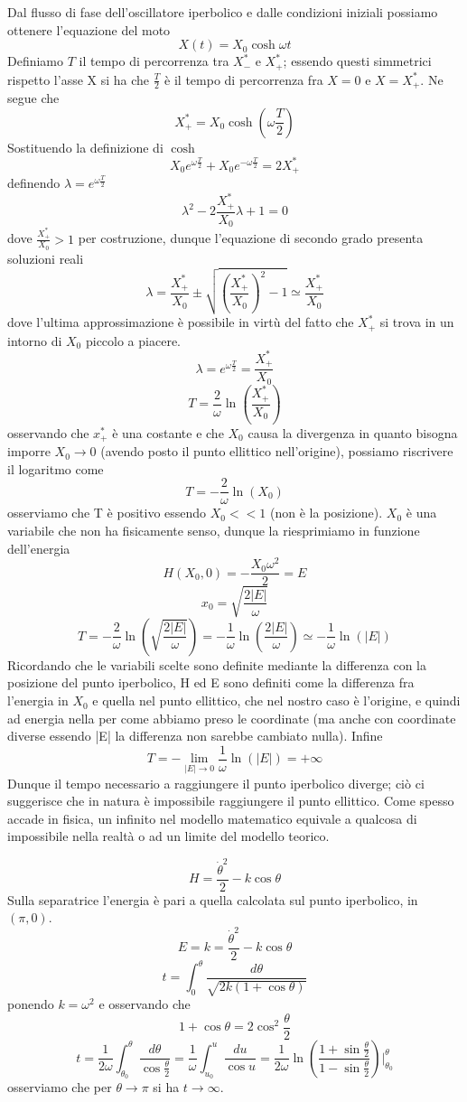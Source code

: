 \documentclass[
10pt, %
a4paper, %
oneside, %
headinclude,footinclude, %
BCOR5mm, %
]{scrartcl}
\begin{document}
\FloatBarrier
Dal flusso di fase dell'oscillatore iperbolico e dalle condizioni iniziali possiamo ottenere l'equazione del moto 
\[X(t) = X_0 \cosh\omega t\]
Definiamo \(T\) il tempo di percorrenza tra \(X^*_-\) e \(X^*_+\); essendo questi simmetrici rispetto l'asse X si ha che \(\frac{T}{2}\) è il tempo di percorrenza fra \(X=0\) e \(X= X^*_+\). Ne segue che 
\[X^*_+ = X_0\cosh(\omega \frac{T}{2})\]
Sostituendo la definizione di $\cosh$
\[X_0e^{\omega \frac{T}{2}}+X_0 e^{-\omega \frac{T}{2}} = 2X^*_+\]
definendo \(\lambda = e^{\omega \frac{T}{2}}\)
\[\lambda^2 -2\frac{X^*_+}{X_0}\lambda +1 = 0\]
dove \(\frac{X^*_+}{X_0}>1\) per costruzione, dunque l'equazione di secondo grado presenta soluzioni reali
\[\lambda = \frac{X^*_+}{X_0}\pm\sqrt{\left(\frac{X^*_+}{X_0}\right)^2-1}\simeq \frac{X^*_+}{X_0}\]
dove l'ultima approssimazione è possibile in virtù del fatto che \(X^*_+\) si trova in un intorno di \(X_0\) piccolo a piacere.
\[\lambda = e^{\omega \frac{T}{2}} = \frac{X^*_+}{X_0}\]
\[T = \frac{2}{\omega}\ln\left( \frac{X^*_+}{X_0}\right)\]
osservando che \(x^*_+\) è una costante e che \(X_0\) causa la divergenza in quanto bisogna imporre \(X_0 \to 0\) (avendo posto il punto ellittico nell'origine), possiamo riscrivere il logaritmo come
\[T = -\frac{2}{\omega}\ln( X_0)\]
osserviamo che T è positivo essendo \(X_0 << 1\) (non è la posizione). \(X_0\) è una variabile che non ha fisicamente senso, dunque la riesprimiamo in funzione dell'energia
\[H(X_0, 0) = -\frac{X_0\omega^2}{2} = E\]
\[x_0 = \sqrt{\frac{2|E|}{\omega}}\]
\[T  = -\frac{2}{\omega}\ln\left(\sqrt{\frac{2|E|}{\omega}}\right) = -\frac{1}{\omega}\ln\left(\frac{2|E|}{\omega}\right)\simeq -\frac{1}{\omega}\ln(|E|)\]
Ricordando che le variabili scelte sono definite mediante la differenza con la posizione del punto iperbolico, H ed E sono definiti come la differenza fra l'energia in \(X_0\) e quella nel punto ellittico, che nel nostro caso è l'origine, e quindi ad energia nella per come abbiamo preso le coordinate (ma anche con coordinate diverse essendo |E| la differenza non sarebbe cambiato nulla). Infine
\[T=-\lim_{|E|\to 0}\frac{1}{\omega}\ln(|E|) = +\infty\]
Dunque il tempo necessario a raggiungere il punto iperbolico diverge; ciò ci suggerisce che in natura è impossibile raggiungere il punto ellittico. Come spesso accade in fisica, un infinito nel modello matematico equivale a qualcosa di impossibile nella realtà o ad un limite del modello teorico.
\begin{esempio}[Il pendolo]
	\[H = \frac{\dot{\theta}^2}{2}-k\cos\theta\]
	Sulla separatrice l'energia è pari a quella calcolata sul punto iperbolico, in \((\pi, 0)\). 
	\[E = k = \frac{\dot{\theta}^2}{2}-k\cos\theta\]
	\[t = \int_0^{\theta}\frac{d\theta}{\sqrt{2k(1+\cos\theta)}} \]
	ponendo \(k = \omega^2\) e osservando che
	\[1+\cos\theta = 2\cos^2\frac{\theta}{2}\]
	\[t = \frac{1}{2\omega}\int_{\theta_0}^\theta \frac{d\theta}{\cos\frac{\theta}{2}}=\frac{1}{\omega}\int^u_{u_0}\frac{du}{\cos u} = \frac{1}{2\omega}\ln\left(\frac{1+\sin\frac{\theta}{2}}{1-\sin\frac{\theta}{2}}\right)|_{\theta_0}^\theta\]
	osserviamo che per $\theta\to \pi$ si ha \(t\to\infty\).
\end{esempio}
\end{document}
